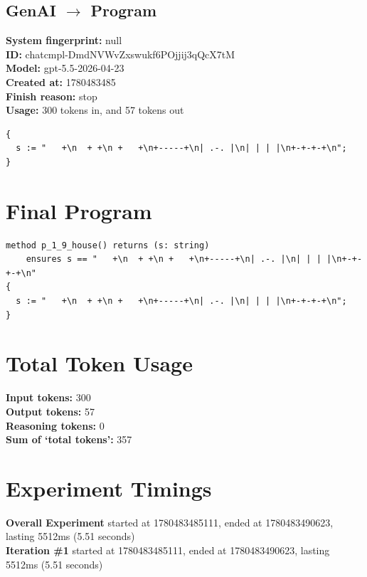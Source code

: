 \documentclass{article}
\begin{document}
\subsection*{GenAI $\rightarrow$ Program}
\textbf{System fingerprint: }null
\\\textbf{ID: }chatcmpl-DmdNVWvZxswukf6POjjij3qQcX7tM
\\\textbf{Model: }gpt-5.5-2026-04-23
\\\textbf{Created at: }1780483485
\\\textbf{Finish reason: }stop
\\\textbf{Usage: }300 tokens in, and 57 tokens out
\begin{lstlisting}
{
  s := "   +\n  + +\n +   +\n+-----+\n| .-. |\n| | | |\n+-+-+-+\n";
}
\end{lstlisting}
\section*{Final Program}
\begin{lstlisting}
method p_1_9_house() returns (s: string)
	ensures s == "   +\n  + +\n +   +\n+-----+\n| .-. |\n| | | |\n+-+-+-+\n"
{
  s := "   +\n  + +\n +   +\n+-----+\n| .-. |\n| | | |\n+-+-+-+\n";
}
\end{lstlisting}
\section*{Total Token Usage}
\textbf{Input tokens: }300
\\\textbf{Output tokens: }57
\\\textbf{Reasoning tokens: }0
\\\textbf{Sum of `total tokens': }357
\section*{Experiment Timings}
\textbf{Overall Experiment} started at 1780483485111, ended at 1780483490623, lasting 5512ms (5.51 seconds)
\\\textbf{Iteration \#1} started at 1780483485111, ended at 1780483490623, lasting 5512ms (5.51 seconds)
\end{document}
